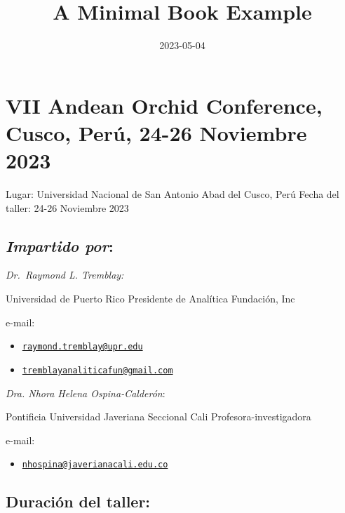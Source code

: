 \documentclass[
]{book}
\title{A Minimal Book Example}
\author{}
\date{\vspace{-2.5em}2023-05-04}
\providecommand{\tightlist}{%
  \setlength{\itemsep}{0pt}\setlength{\parskip}{0pt}}
\theoremstyle{definition}
\theoremstyle{definition}
\theoremstyle{definition}
\theoremstyle{definition}
\theoremstyle{remark}
\begin{document}
\maketitle

{
\setcounter{tocdepth}{1}
\tableofcontents
}
\hypertarget{sec-vii-andean-orchid-conference-cusco-peruxfa-24-26-noviembre-2023}{%
\chapter{VII Andean Orchid Conference, Cusco, Perú, 24-26 Noviembre 2023}\label{sec-vii-andean-orchid-conference-cusco-peruxfa-24-26-noviembre-2023}}

Lugar: Universidad Nacional de San Antonio Abad del Cusco, Perú Fecha
del taller: 24-26 Noviembre 2023

\hypertarget{impartido-por}{%
\section{\texorpdfstring{\emph{Impartido por}:}{Impartido por:}}\label{impartido-por}}

\emph{Dr.~Raymond L. Tremblay:}

Universidad de Puerto Rico Presidente de Analítica Fundación, Inc

e-mail:

\begin{itemize}
\item
  \href{mailto:raymond.tremblay@upr.edu}{\nolinkurl{raymond.tremblay@upr.edu}}
\item
  \href{mailto:tremblayanaliticafun@gmail.com}{\nolinkurl{tremblayanaliticafun@gmail.com}}
\end{itemize}

\emph{Dra. Nhora Helena Ospina-Calderón}:

Pontificia Universidad Javeriana Seccional Cali Profesora-investigadora

e-mail:

\begin{itemize}
\tightlist
\item
  \href{mailto:nhospina@javerianacali.edu.co}{\nolinkurl{nhospina@javerianacali.edu.co}}
\end{itemize}

\hypertarget{duraciuxf3n-del-taller}{%
\section{Duración del taller:}\label{duraciuxf3n-del-taller}}
\end{document}
